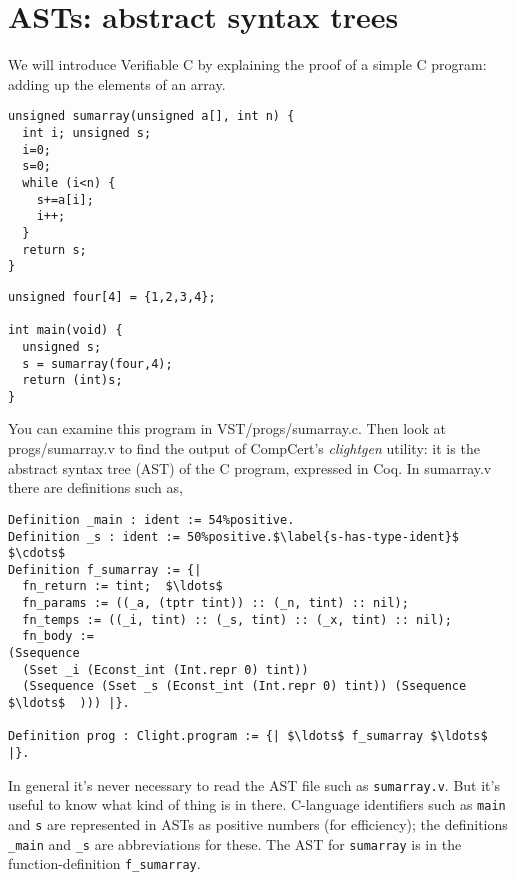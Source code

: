 \documentclass[12pt,fleqn,openany,oneside,showtrims]{memoir}
\begin{document}
\chapter{ASTs: abstract syntax trees}

We will introduce Verifiable C by explaining the
proof of a simple C program:  adding up the elements of an array.

\begin{minipage}{2in}
\begin{lstlisting}
unsigned sumarray(unsigned a[], int n) {
  int i; unsigned s;
  i=0;
  s=0;
  while (i<n) {
    s+=a[i];
    i++;
  }
  return s;
}
\end{lstlisting}
\end{minipage}\hfill\begin{minipage}{2in}
\begin{lstlisting}
unsigned four[4] = {1,2,3,4};

int main(void) {
  unsigned s;
  s = sumarray(four,4);
  return (int)s;
}
\end{lstlisting}
\end{minipage}

You can examine this program in VST/progs/sumarray.c.
Then look at progs/sumarray.v to find the output
of CompCert's \emph{clightgen} utility:  it is the
abstract syntax tree (AST) of the C program, expressed in Coq.
In sumarray.v there are definitions such as,
\begin{lstlisting}
Definition _main : ident := 54%positive.
Definition _s : ident := 50%positive.$\label{s-has-type-ident}$
$\cdots$
Definition f_sumarray := {|
  fn_return := tint;  $\ldots$
  fn_params := ((_a, (tptr tint)) :: (_n, tint) :: nil);
  fn_temps := ((_i, tint) :: (_s, tint) :: (_x, tint) :: nil);
  fn_body :=
(Ssequence
  (Sset _i (Econst_int (Int.repr 0) tint))
  (Ssequence (Sset _s (Econst_int (Int.repr 0) tint)) (Ssequence $\ldots$  ))) |}.

Definition prog : Clight.program := {| $\ldots$ f_sumarray $\ldots$ |}.
\end{lstlisting}

In general it's never necessary to read the AST file such as
\lstinline{sumarray.v}.  But it's useful to know what kind of thing
is in there. C-language identifiers such as \lstinline{main} and \lstinline{s}
are represented in ASTs as positive numbers (for efficiency); the definitions
\lstinline{_main} and \lstinline{_s} are abbreviations for these.
The AST for \lstinline{sumarray} is in the function-definition
\lstinline{f_sumarray}.
\end{document}
